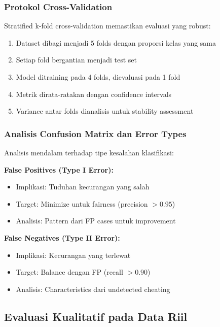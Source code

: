 \subsubsection{Protokol Cross-Validation}
\label{sec:protokolCV}

Stratified k-fold cross-validation memastikan evaluasi yang robust:

\begin{enumerate}
    \item Dataset dibagi menjadi 5 folds dengan proporsi kelas yang sama
    \item Setiap fold bergantian menjadi test set
    \item Model ditraining pada 4 folds, dievaluasi pada 1 fold
    \item Metrik dirata-ratakan dengan confidence intervals
    \item Variance antar folds dianalisis untuk stability assessment
\end{enumerate}

\subsubsection{Analisis Confusion Matrix dan Error Types}
\label{sec:confusionMatrixAnalysis}

Analisis mendalam terhadap tipe kesalahan klasifikasi:

\textbf{False Positives (Type I Error):}
\begin{itemize}
    \item Implikasi: Tuduhan kecurangan yang salah
    \item Target: Minimize untuk fairness (precision $> 0.95$)
    \item Analisis: Pattern dari FP cases untuk improvement
\end{itemize}

\textbf{False Negatives (Type II Error):}
\begin{itemize}
    \item Implikasi: Kecurangan yang terlewat
    \item Target: Balance dengan FP (recall $> 0.90$)
    \item Analisis: Characteristics dari undetected cheating
\end{itemize}

\subsection{Evaluasi Kualitatif pada Data Riil}
\label{sec:evaluasiKualitatif}

